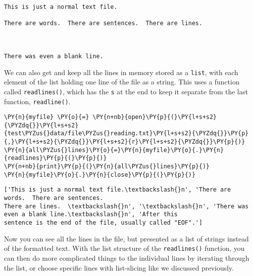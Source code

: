     \begin{Verbatim}[commandchars=\\\{\}]
This is just a normal text file.

There are words.  There are sentences.  There are lines.



There was even a blank line.

    \end{Verbatim}

    We can also get and keep all the lines in memory stored as a
\texttt{list}, with each element of the list holding one line of the
file as a string. This uses a function called \texttt{readlines()},
which has the \texttt{s} at the end to keep it separate from the last
function, \texttt{readline()}.

    \begin{tcolorbox}[breakable, size=fbox, boxrule=1pt, pad at break*=1mm,colback=cellbackground, colframe=cellborder]
\begin{Verbatim}[commandchars=\\\{\}]
\PY{n}{myfile} \PY{o}{=} \PY{n+nb}{open}\PY{p}{(}\PY{l+s+s2}{\PYZdq{}}\PY{l+s+s2}{test\PYZus{}data/file\PYZus{}reading.txt}\PY{l+s+s2}{\PYZdq{}}\PY{p}{,}\PY{l+s+s2}{\PYZdq{}}\PY{l+s+s2}{r}\PY{l+s+s2}{\PYZdq{}}\PY{p}{)}
\PY{n}{all\PYZus{}lines}\PY{o}{=}\PY{n}{myfile}\PY{o}{.}\PY{n}{readlines}\PY{p}{(}\PY{p}{)}
\PY{n+nb}{print}\PY{p}{(}\PY{n}{all\PYZus{}lines}\PY{p}{)}
\PY{n}{myfile}\PY{o}{.}\PY{n}{close}\PY{p}{(}\PY{p}{)}
\end{Verbatim}
\end{tcolorbox}

    \begin{Verbatim}[commandchars=\\\{\}]
['This is just a normal text file.\textbackslash{}n', 'There are words.  There are sentences.
There are lines.  \textbackslash{}n', '\textbackslash{}n', 'There was even a blank line.\textbackslash{}n', 'After this
sentence is the end of the file, usually called "EOF".']
    \end{Verbatim}

    Now you can see all the lines in the file, but presented as a list of
strings instead of the formatted text. With the list structure of the
\texttt{readlines()} function, you can then do more complicated things
to the individual lines by iterating through the list, or choose
specific lines with list-slicing like we discussed previously.


